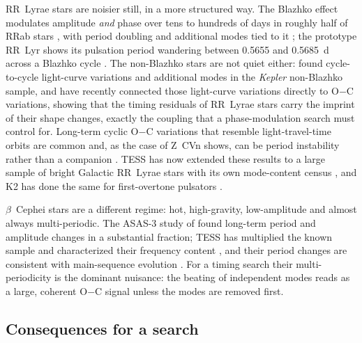 \documentclass[final,5p]{elsarticle}
\newcommand{\oc}{O$-$C}
\newcommand{\bcep}{\ensuremath{\beta}~Cephei}
\begin{document}
RR~Lyrae stars are noisier still, in a more structured way. The Blazhko effect modulates amplitude \emph{and} phase over tens to hundreds of days in roughly half of RRab stars \citep{Kolenberg2011, Skarka2020}, with period doubling and additional modes tied to it \citep{Szabo2010, Benko2010, Moskalik2015}; the prototype RR~Lyr shows its pulsation period wandering between 0.5655 and 0.5685~d across a Blazhko cycle \citep{Stellingwerf2013}. The non-Blazhko stars are not quiet either: \citet{Benko2019} found cycle-to-cycle light-curve variations and additional modes in the \emph{Kepler} non-Blazhko sample, and \citet{Benko2025, Benko2026} have recently connected those light-curve variations directly to \oc{} variations, showing that the timing residuals of RR~Lyrae stars carry the imprint of their shape changes, exactly the coupling that a phase-modulation search must control for. Long-term cyclic \oc{} variations that resemble light-travel-time orbits are common and, as the case of Z~CVn shows, can be period instability rather than a companion \citep{Skarka2018}. TESS has now extended these results to a large sample of bright Galactic RR~Lyrae stars with its own mode-content census \citep{Molnar2022}, and K2 has done the same for first-overtone pulsators \citep{Netzel2023}.

\bcep{} stars are a different regime: hot, high-gravity, low-amplitude and almost always multi-periodic. The ASAS-3 study of \citet{Pigulski2008} found long-term period and amplitude changes in a substantial fraction; TESS has multiplied the known sample and characterized their frequency content \citep{Shi2024, Eze2024, Shi2025}, and their period changes are consistent with main-sequence evolution \citep{Neilson2015}. For a timing search their multi-periodicity is the dominant nuisance: the beating of independent modes reads as a large, coherent \oc{} signal unless the modes are removed first.

\subsection{Consequences for a search}
\label{sec:foreground}
\end{document}

